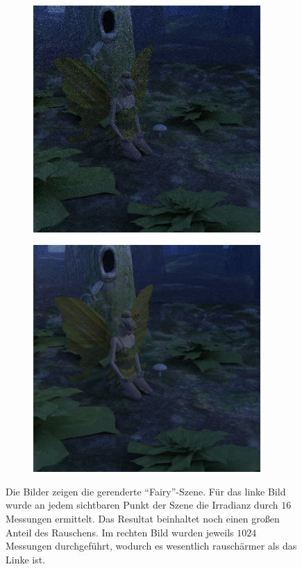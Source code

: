		\begin{figure}[h]
			\begin{subfigure}[b]{0.5\textwidth}
				\center
				\includegraphics[width=0.95\textwidth]{pic/noise-fairy-high.png}
			\end{subfigure}
			\begin{subfigure}[b]{0.5\textwidth}
				\center
				\includegraphics[width=0.95\textwidth]{pic/noise-fairy-low.png}
			\end{subfigure}
			\caption[Rauschen durch Path Tracing anhand der \enquote{Fairy}-Szene]{Die Bilder zeigen die gerenderte \enquote{Fairy}-Szene. Für das linke Bild wurde an jedem sichtbaren Punkt der Szene die Irradianz durch $16$ Messungen ermittelt. Das Resultat beinhaltet noch einen großen Anteil des Rauschens. Im rechten Bild wurden jeweils $1024$ Messungen durchgeführt, wodurch es wesentlich rauschärmer als das Linke ist.}
			\label{fig:fairy-noise}
		\end{figure}

